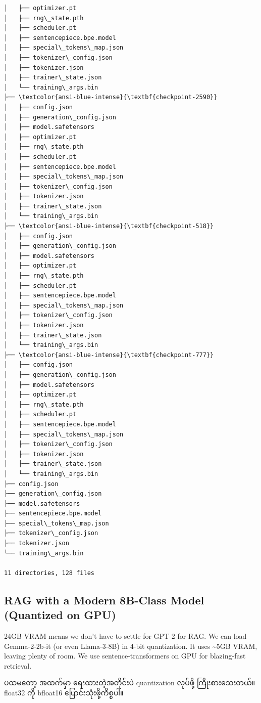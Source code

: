 \documentclass[11pt]{article}
\begin{document}
\begin{Verbatim}[commandchars=\\\{\}]
│   ├── optimizer.pt
│   ├── rng\_state.pth
│   ├── scheduler.pt
│   ├── sentencepiece.bpe.model
│   ├── special\_tokens\_map.json
│   ├── tokenizer\_config.json
│   ├── tokenizer.json
│   ├── trainer\_state.json
│   └── training\_args.bin
├── \textcolor{ansi-blue-intense}{\textbf{checkpoint-2590}}
│   ├── config.json
│   ├── generation\_config.json
│   ├── model.safetensors
│   ├── optimizer.pt
│   ├── rng\_state.pth
│   ├── scheduler.pt
│   ├── sentencepiece.bpe.model
│   ├── special\_tokens\_map.json
│   ├── tokenizer\_config.json
│   ├── tokenizer.json
│   ├── trainer\_state.json
│   └── training\_args.bin
├── \textcolor{ansi-blue-intense}{\textbf{checkpoint-518}}
│   ├── config.json
│   ├── generation\_config.json
│   ├── model.safetensors
│   ├── optimizer.pt
│   ├── rng\_state.pth
│   ├── scheduler.pt
│   ├── sentencepiece.bpe.model
│   ├── special\_tokens\_map.json
│   ├── tokenizer\_config.json
│   ├── tokenizer.json
│   ├── trainer\_state.json
│   └── training\_args.bin
├── \textcolor{ansi-blue-intense}{\textbf{checkpoint-777}}
│   ├── config.json
│   ├── generation\_config.json
│   ├── model.safetensors
│   ├── optimizer.pt
│   ├── rng\_state.pth
│   ├── scheduler.pt
│   ├── sentencepiece.bpe.model
│   ├── special\_tokens\_map.json
│   ├── tokenizer\_config.json
│   ├── tokenizer.json
│   ├── trainer\_state.json
│   └── training\_args.bin
├── config.json
├── generation\_config.json
├── model.safetensors
├── sentencepiece.bpe.model
├── special\_tokens\_map.json
├── tokenizer\_config.json
├── tokenizer.json
└── training\_args.bin

11 directories, 128 files
    \end{Verbatim}

    \hypertarget{rag-with-a-modern-8b-class-model-quantized-on-gpu}{%
\subsection{RAG with a Modern 8B-Class Model (Quantized on
GPU)}\label{rag-with-a-modern-8b-class-model-quantized-on-gpu}}

24GB VRAM means we don't have to settle for GPT-2 for RAG. We can load
Gemma-2-2b-it (or even Llama-3-8B) in 4-bit quantization. It uses
\textasciitilde5GB VRAM, leaving plenty of room. We use
sentence-transformers on GPU for blazing-fast retrieval.

{\burmesefont ပထမတော့} {\burmesefont အထက်မှာ} {\burmesefont ရေးထားတဲ့အတိုင်းပဲ} quantization {\burmesefont လုပ်ဖို့} {\burmesefont ကြိုးစားသေးတယ်။} float32 {\burmesefont ကို}
bfloat16 {\burmesefont ပြောင်းသုံးဖို့ကိစ္စပါ။}
\end{document}
